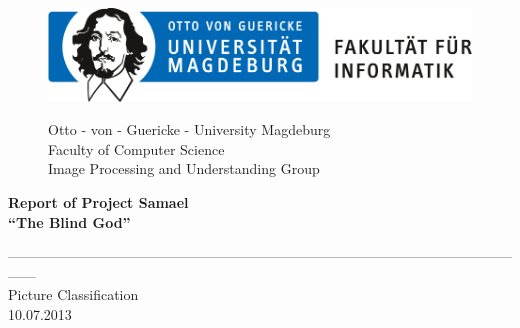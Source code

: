 \documentclass[liststotoc,11pt,a4paper]{article}
\begin{document}
\begin{figure}[htbp]
\begin{minipage}[t]{5cm}
\vspace{0pt}
\includegraphics{ovgu_logo_fak_inf}
\end{minipage}
\hfill
\begin{minipage}[t]{8cm}
\vspace{0pt}
\begin{flushright}     
Otto - von - Guericke - University Magdeburg\\Faculty of Computer Science\\Image Processing and Understanding Group\\
\end{flushright}
\end{minipage}
\end{figure}
\vspace{50pt}

\begin{center}
\huge\bfseries Report of Project Samael\\
\vspace{10pt}
\large"`The Blind God"'\\
\end{center}
\begin{center}
\vspace{20pt}
------------------------------------------------------------------------------------------------------------------\\[30pt]
\large Picture Classification\\
\vspace{10pt}
\normalsize 10.07.2013 \\[220pt] 
\end {center}
\end{document}
